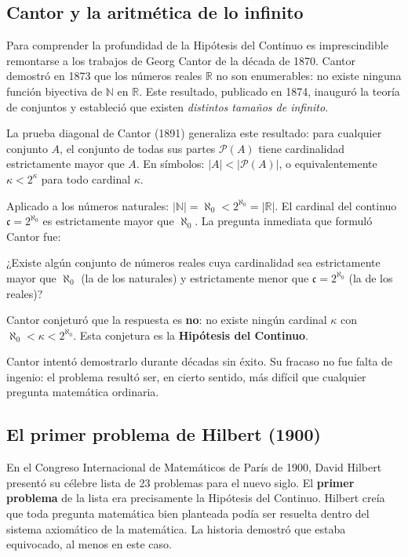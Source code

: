 \subsection{Cantor y la aritmética de lo infinito}

Para comprender la profundidad de la Hipótesis del Continuo es imprescindible remontarse a los trabajos de Georg Cantor de la década de 1870. Cantor demostró en 1873 que los números reales $\mathbb{R}$ no son enumerables: no existe ninguna función biyectiva de $\mathbb{N}$ en $\mathbb{R}$. Este resultado, publicado en 1874, inauguró la teoría de conjuntos y estableció que existen \emph{distintos tamaños de infinito}.

La prueba diagonal de Cantor (1891) generaliza este resultado: para cualquier conjunto $A$, el conjunto de todas sus partes $\mathcal{P}(A)$ tiene cardinalidad estrictamente mayor que $A$. En símbolos: $|A| < |\mathcal{P}(A)|$, o equivalentemente $\kappa < 2^\kappa$ para todo cardinal $\kappa$.

Aplicado a los números naturales: $|\mathbb{N}| = \aleph_0 < 2^{\aleph_0} = |\mathbb{R}|$. El cardinal del continuo $\mathfrak{c} = 2^{\aleph_0}$ es estrictamente mayor que $\aleph_0$. La pregunta inmediata que formuló Cantor fue:

\begin{importante}
¿Existe algún conjunto de números reales cuya cardinalidad sea estrictamente mayor que $\aleph_0$ (la de los naturales) y estrictamente menor que $\mathfrak{c} = 2^{\aleph_0}$ (la de los reales)?
\end{importante}

\begin{importante}
Cantor conjeturó que la respuesta es \textbf{no}: no existe ningún cardinal $\kappa$ con $\aleph_0 < \kappa < 2^{\aleph_0}$. Esta conjetura es la \textbf{Hipótesis del Continuo}.
\end{importante}

Cantor intentó demostrarlo durante décadas sin éxito. Su fracaso no fue falta de ingenio: el problema resultó ser, en cierto sentido, más difícil que cualquier pregunta matemática ordinaria.

\subsection{El primer problema de Hilbert (1900)}

En el Congreso Internacional de Matemáticos de París de 1900, David Hilbert presentó su célebre lista de 23 problemas para el nuevo siglo. El \textbf{primer problema} de la lista era precisamente la Hipótesis del Continuo. Hilbert creía que toda pregunta matemática bien planteada podía ser resuelta dentro del sistema axiomático de la matemática. La historia demostró que estaba equivocado, al menos en este caso.

